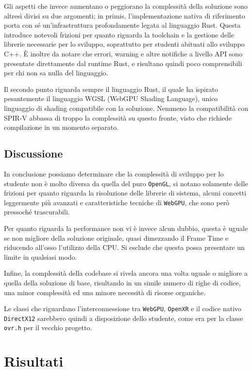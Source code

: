 \documentclass[a4paper, 11pt, twoside]{report}
\newif\ifshowlogo
\newcommand{\blankpage}{
    \clearpage
    \thispagestyle{empty}     %
    \showlogofalse            %
    \hbox{}                   %
    \newpage
    \showlogotrue             %
}
\begin{document}
Gli aspetti che invece aumentano o peggiorano la complessità della soluzione sono altresì divisi su due argomenti;
in primis, l'implementazione nativa di riferimento porta con sé un'infrastruttura profondamente legata al linguaggio
Rust. Questa introduce notevoli frizioni per quanto riguarda la toolchain e la gestione delle librerie necessarie per
lo sviluppo, soprattutto per studenti abituati allo sviluppo C++. È inoltre da notare che errori, warning e altre
notifiche a livello API sono presentate direttamente dal runtime Rust, e risultano quindi poco comprensibili per chi
non sa nulla del linguaggio.

Il secondo punto riguarda sempre il linguaggio Rust, il quale ha ispirato pesantemente il linguaggio WGSL (WebGPU
Shading Language), unico linguaggio di shading compatibile con la soluzione. Nemmeno la compatibilità con SPIR-V
abbassa di troppo la complessità su questo fronte, visto che richiede compilazione in un momento separato.

\section{Discussione}

In conclusione possiamo determinare che la complessità di sviluppo per lo studente non è molto diversa da quella del
puro \texttt{OpenGL}, si notano solamente delle frizioni per quanto riguarda la risoluzione delle librerie di sistema,
alcuni concetti leggermente più avanzati e caratteristiche tecniche di \texttt{WebGPU}, che sono però pressoché
trascurabili.

Per quanto riguarda la performance non vi è invece alcun dubbio, questa è uguale se non migliore della soluzione
originale, quasi dimezzando il Frame Time e riducendo all'osso l'utilizzo della CPU. Si esclude che questa possa
presentare un limite in qualsiasi modo.

Infine, la complessità della codebase si rivela ancora una volta uguale o migliore a quella della soluzione di base,
risultando in un simile numero di righe di codice, una minor complessità ed una minore necessità di risorse organiche.

Le classi che riguardano l'interconnessione tra \texttt{WebGPU}, \texttt{\gls{OpenXR}} e il codice nativo
\texttt{\gls{DirectX}12} sarebbero quindi a disposizione dello studente, come era per la classe \texttt{ovr.h} per il
vecchio progetto.

\blankpage

\chapter{Risultati}
\end{document}
